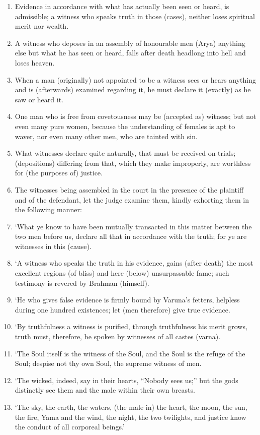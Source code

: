 \begin{enumerate}
\item Evidence in accordance with what has actually been seen or heard, is admissible; a witness who speaks truth in those (cases), neither loses spiritual merit nor wealth.
\item A witness who deposes in an assembly of honourable men (Arya) anything else but what he has seen or heard, falls after death headlong into hell and loses heaven.
\item When a man (originally) not appointed to be a witness sees or hears anything and is (afterwards) examined regarding it, he must declare it (exactly) as he saw or heard it.
\item One man who is free from covetousness may be (accepted as) witness; but not even many pure women, because the understanding of females is apt to waver, nor even many other men, who are tainted with sin.
\item What witnesses declare quite naturally, that must be received on trials; (depositions) differing from that, which they make improperly, are worthless for (the purposes of) justice.
\item The witnesses being assembled in the court in the presence of the plaintiff and of the defendant, let the judge examine them, kindly exhorting them in the following manner:
\item `What ye know to have been mutually transacted in this matter between the two men before us, declare all that in accordance with the truth; for ye are witnesses in this (cause).
\item `A witness who speaks the truth in his evidence, gains (after death) the most excellent regions (of bliss) and here (below) unsurpassable fame; such testimony is revered by Brahman (himself).
\item `He who gives false evidence is firmly bound by Varuna's fetters, helpless during one hundred existences; let (men therefore) give true evidence.
\item `By truthfulness a witness is purified, through truthfulness his merit grows, truth must, therefore, be spoken by witnesses of all castes (varna).
\item `The Soul itself is the witness of the Soul, and the Soul is the refuge of the Soul; despise not thy own Soul, the supreme witness of men.
\item `The wicked, indeed, say in their hearts, ``Nobody sees us;'' but the gods distinctly see them and the male within their own breasts.
\item `The sky, the earth, the waters, (the male in) the heart, the moon, the sun, the fire, Yama and the wind, the night, the two twilights, and justice know the conduct of all corporeal beings.'

\end{enumerate}
